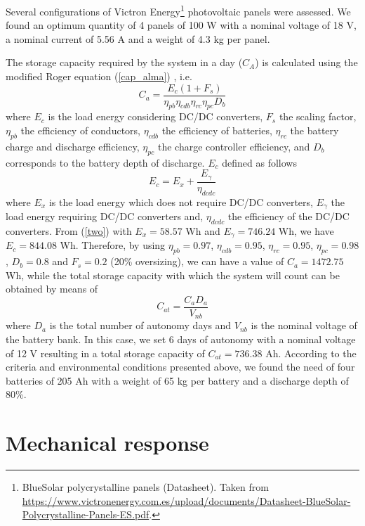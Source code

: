 \documentclass[letterpaper,11pt]{article}
\begin{document}
Several configurations of Victron Energy\footnote{BlueSolar polycrystalline panels (Datasheet). Taken from \url{https://www.victronenergy.com.es/upload/documents/Datasheet-BlueSolar-Polycrystalline-Panels-ES.pdf}.} photovoltaic panels were assessed. We found an optimum quantity of 4 panels of 100 W with a nominal voltage of 18 V, a nominal current of 5.56 A and a weight of 4.3 kg per panel.

The storage capacity required by the system in a day ($C_A$) is calculated using the modified Roger equation (\ref{cap_alma}) \cite{messenger2017photovoltaic}, i.e. 
\begin{equation}
C_a=\frac{E_c(1+F_s)}{\eta_{pb}\eta_{cdb}\eta_{rc}\eta_{pc}D_{b}} \label{cap_alma}
\end{equation}
where $E_c$ is the load energy considering DC/DC converters, $F_s$ the scaling factor, $\eta_{pb}$ the efficiency of conductors, $\eta_{cdb}$ the efficiency of batteries, $\eta_{rc}$ the battery charge and discharge efficiency, $\eta_{pc}$ the charge controller efficiency, and $D_{b}$ corresponds to the battery depth of discharge. $E_c$ defined as follows
\begin{equation}
E_c=E_x+\frac{E_{\gamma}}{\eta_{dcdc}}
\label{two}
\end{equation}
where $E_{x}$ is the load energy which does not require DC/DC converters, $E_{\gamma}$ the load energy requiring DC/DC converters and, $\eta_{dcdc}$ the efficiency of the DC/DC converters. From (\ref{two}) with $E_{x}=58.57$ Wh and $E_{\gamma}=746.24$ Wh, we have $E_c=844.08$ Wh. Therefore, by using $\eta_{pb}=0.97$, $\eta_{cdb}=0.95$, $\eta_{rc}=0.95$, $\eta_{pc}=0.98$, $D_{b}=0.8$ and $F_s=0.2$ (20\% oversizing), we can have a value of $C_a=1472.75$ Wh, while the total storage capacity with which the system will count can be obtained by means of
\begin{equation}
C_{at}=\frac{C_aD_a}{V_{nb}}
\end{equation}
where $D_a$ is the total number of autonomy days and $V_{nb}$ is the nominal voltage of the battery bank. In this case, we set 6 days of autonomy with a nominal voltage of 12 V resulting in a total storage capacity of $C_{at}=736.38$ Ah. According to the criteria and environmental conditions presented above, we found the need of four batteries of 205 Ah with a weight of 65 kg per battery and a discharge depth of 80\%.

\section{Mechanical response}
\label{mechanical}
\end{document}
